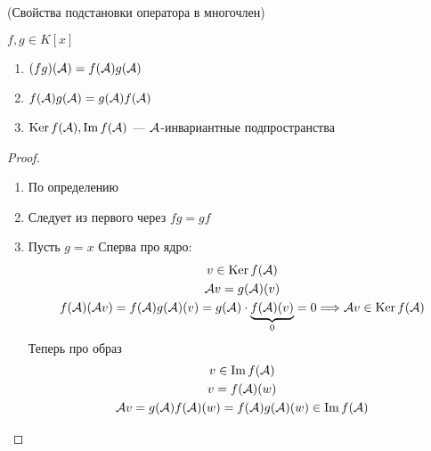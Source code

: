 \begin{theorem}(Свойства подстановки оператора в многочлен)

    $ f, g \in K[x] $
    \begin{enumerate}
        \item $ (fg)(\mathcal{A}) = f(\mathcal{A}) g(\mathcal{A}) $
        \item $ f(\mathcal{A}) g(\mathcal{A}) = g(\mathcal{A}) f(\mathcal{A}) $
        \item $ \operatorname{Ker} f(\mathcal{A}) , \operatorname{Im} f(\mathcal{A})$  ---  $\mathcal{A} $-инвариантные подпространства
    \end{enumerate}
    \begin{proof} \quad
    
    \begin{enumerate}
        \item По определению
        \item Следует из первого через $fg = gf$
        \item Пусть $g = x$
        \quad Сперва про ядро: \\
        \begin{gather*}
            v \in \operatorname{Ker} f(\mathcal{A}) \\
            \mathcal{A} v = g(\mathcal{A}) (v) \\
            f(\mathcal{A}) (\mathcal{A} v) = f(\mathcal{A}) g(\mathcal{A}) (v) = g(\mathcal{A}) \cdot \underbrace{f(\mathcal{A}) (v)}_{\text{$ 0 $}} = 0 \Longrightarrow \mathcal{A} v \in \operatorname{Ker} f(\mathcal{A}) \\
        \end{gather*}
        \quad Теперь про образ \\
        \begin{gather*}
            v \in \operatorname{Im} f(\mathcal{A}) \\
            v = f(\mathcal{A}) (w) \\
            \mathcal{A} v = g(\mathcal{A}) f(\mathcal{A}) (w) = f(\mathcal{A}) g(\mathcal{A}) (w) \in \operatorname{Im} f(\mathcal{A})
        \end{gather*}
    \end{enumerate}
    \end{proof}
\end{theorem}


